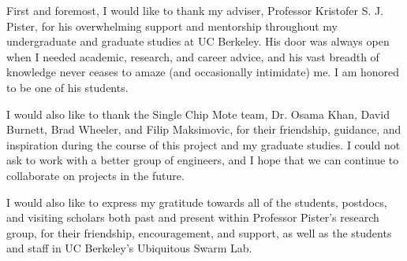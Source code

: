 First and foremost, I would like to thank my adviser, Professor Kristofer S. J. Pister, for his overwhelming support and mentorship throughout my undergraduate and graduate studies at UC Berkeley. His door was always open when I needed academic, research, and career advice, and his vast breadth of knowledge never ceases to amaze (and occasionally intimidate) me. I am honored to be one of his students.

I would also like to thank the Single Chip Mote team, Dr. Osama Khan, David Burnett, Brad Wheeler, and Filip Maksimovic, for their friendship, guidance, and inspiration during the course of this project and my graduate studies. I could not ask to work with a better group of engineers, and I hope that we can continue to collaborate on projects in the future.

I would also like to express my gratitude towards all of the students, postdocs, and visiting scholars both past and present within Professor Pister's research group, for their friendship, encouragement, and support, as well as the students and staff in UC Berkeley's Ubiquitous Swarm Lab. 